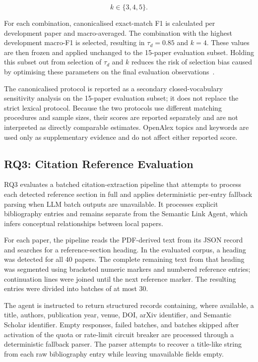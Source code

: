 \documentclass[runningheads]{llncs}
\begin{document}
\[
k \in \{3,4,5\}.
\]

For each combination, canonicalised exact-match F1 is calculated per
development paper and macro-averaged. The combination with the highest
development macro-F1 is selected, resulting in
\(\tau_d=0.85\) and \(k=4\). These values are then frozen and applied
unchanged to the 15-paper evaluation subset. Holding this subset out
from selection of \(\tau_d\) and \(k\) reduces the risk of selection
bias caused by optimising these parameters on the final evaluation
observations~\cite{cawley2010overfitting}.

The canonicalised protocol is reported as a secondary closed-vocabulary
sensitivity analysis on the 15-paper evaluation subset; it does not
replace the strict lexical protocol. Because the two protocols use
different matching procedures and sample sizes, their scores are
reported separately and are not interpreted as directly comparable
estimates. OpenAlex topics and keywords are used only as supplementary
evidence and do not affect either reported score.

\subsection{RQ3: Citation Reference Evaluation}
\label{sec:rq3_method}

RQ3 evaluates a batched citation-extraction pipeline that attempts to
process each detected reference section in full and applies
deterministic per-entry fallback parsing when LLM batch outputs are
unavailable. It processes explicit bibliography entries and remains
separate from the Semantic Link Agent, which infers conceptual
relationships between local papers.

For each paper, the pipeline reads the PDF-derived text from its JSON
record and searches for a reference-section heading. In the evaluated
corpus, a heading was detected for all 40 papers. The complete remaining
text from that heading was segmented using bracketed numeric markers and
numbered reference entries; continuation lines were joined until the
next reference marker. The resulting entries were divided into batches
of at most 30.

The agent is instructed to return structured records containing, where
available, a title, authors, publication year, venue, DOI, arXiv
identifier, and Semantic Scholar identifier. Empty responses, failed
batches, and batches skipped after activation of the quota or
rate-limit circuit breaker are processed through a deterministic
fallback parser. The parser attempts to recover a title-like string
from each raw bibliography entry while leaving unavailable fields
empty.
\end{document}
